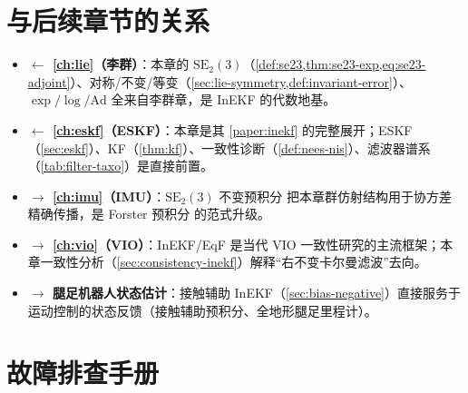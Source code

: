 \section*{与后续章节的关系}

\begin{itemize}
  \item \textbf{$\leftarrow$ \cref{ch:lie}（李群）}：本章的 $\mathrm{SE}_2(3)$（\cref{def:se23,thm:se23-exp,eq:se23-adjoint}）、对称/不变/等变（\cref{sec:lie-symmetry,def:invariant-error}）、$\exp/\log/\mathrm{Ad}$ 全来自李群章，是 InEKF 的代数地基。
  \item \textbf{$\leftarrow$ \cref{ch:eskf}（ESKF）}：本章是其 \cref{paper:inekf} 的完整展开；ESKF（\cref{sec:eskf}）、KF（\cref{thm:kf}）、一致性诊断（\cref{def:nees-nis}）、滤波器谱系（\cref{tab:filter-taxo}）是直接前置。
  \item \textbf{$\to$ \cref{ch:imu}（IMU）}：$\mathrm{SE}_2(3)$ 不变预积分\cite{brossard2021associating} 把本章群仿射结构用于协方差精确传播，是 Forster 预积分\cite{forster2017preintegration} 的范式升级。
  \item \textbf{$\to$ \cref{ch:vio}（VIO）}：InEKF/EqF 是当代 VIO 一致性研究的主流框架；本章一致性分析（\cref{sec:consistency-inekf}）解释“右不变卡尔曼滤波”去向。
  \item \textbf{$\to$ 腿足机器人状态估计}：接触辅助 InEKF（\cref{sec:bias-negative}）直接服务于运动控制的状态反馈（接触辅助预积分\cite{hartley2018legged}、全地形腿足里程计\cite{wisth2023vilens}）。
\end{itemize}

\section*{故障排查手册}

